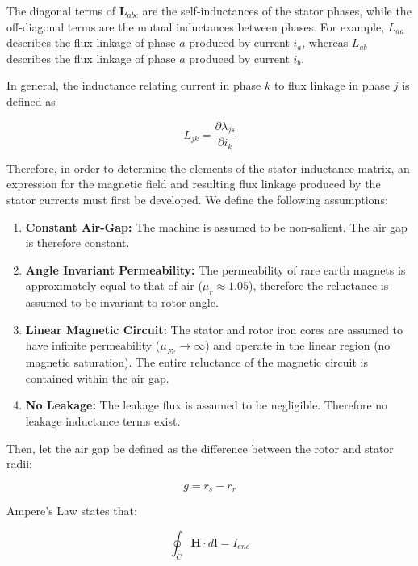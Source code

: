 \documentclass{article}
\begin{document}
The diagonal terms of $\mathbf{L}_{abc}$ are the self-inductances of the stator phases, while the off-diagonal terms are the mutual inductances between phases. For example, $L_{aa}$ describes the flux linkage of phase $a$ produced by current $i_a$, whereas $L_{ab}$ describes the flux linkage of phase $a$ produced by current $i_b$.

In general, the inductance relating current in phase $k$ to flux linkage in phase $j$ is defined as

\begin{equation}
    L_{jk} = \frac{\partial \lambda_{js}}{\partial i_k}
\end{equation}

Therefore, in order to determine the elements of the stator inductance matrix, an expression for the magnetic field and resulting flux linkage produced by the stator currents must first be developed. We define the following assumptions:

\begin{enumerate}
    \item \textbf{Constant Air-Gap:} The machine is assumed to be non-salient. The air gap is therefore constant.
    \item \textbf{Angle Invariant Permeability:} The permeability of rare earth magnets is approximately equal to that of air ($\mu_r\approx1.05$), therefore the reluctance is assumed to be invariant to rotor angle.
    \item \textbf{Linear Magnetic Circuit:} The stator and rotor iron cores are assumed to have infinite permeability ($\mu_{Fe} \to \infty$) and operate in the linear region (no magnetic saturation). The entire reluctance of the magnetic circuit is contained within the air gap.
    \item \textbf{No Leakage:} The leakage flux is assumed to be negligible. Therefore no leakage inductance terms exist.
\end{enumerate}

Then, let the air gap be defined as the difference between the rotor and stator radii:

\begin{equation}
    g = r_s - r_r
\end{equation}

Ampere's Law states that:

\begin{equation}
    \oint_C \mathbf{H} \cdot d\mathbf{l} = I_{enc}
\end{equation}
\end{document}
